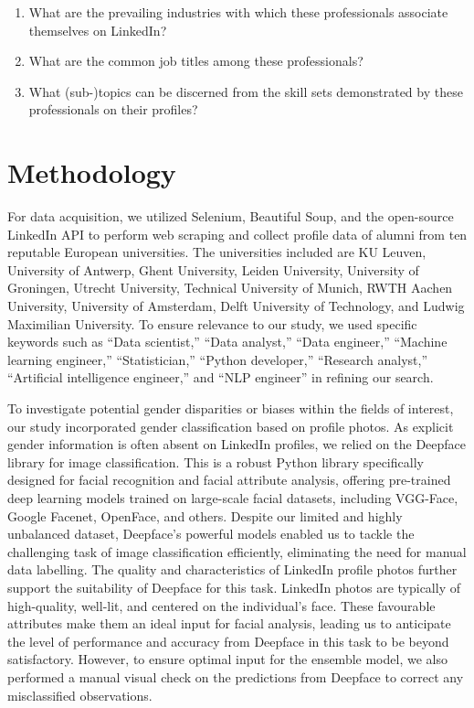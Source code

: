 \documentclass[11pt,]{article}
\begin{document}
\begin{enumerate}
\def\labelenumi{\arabic{enumi}.}
\item
  What are the prevailing industries with which these professionals
  associate themselves on LinkedIn?
\item
  What are the common job titles among these professionals?
\item
  What (sub-)topics can be discerned from the skill sets demonstrated by
  these professionals on their profiles?
\end{enumerate}

\hypertarget{methodology}{%
\section{Methodology}\label{methodology}}

For data acquisition, we utilized Selenium, Beautiful Soup, and the
open-source LinkedIn API to perform web scraping and collect profile
data of alumni from ten reputable European universities. The
universities included are KU Leuven, University of Antwerp, Ghent
University, Leiden University, University of Groningen, Utrecht
University, Technical University of Munich, RWTH Aachen University,
University of Amsterdam, Delft University of Technology, and Ludwig
Maximilian University. To ensure relevance to our study, we used
specific keywords such as ``Data scientist,'' ``Data analyst,'' ``Data
engineer,'' ``Machine learning engineer,'' ``Statistician,'' ``Python
developer,'' ``Research analyst,'' ``Artificial intelligence engineer,''
and ``NLP engineer'' in refining our search.

To investigate potential gender disparities or biases within the fields
of interest, our study incorporated gender classification based on
profile photos. As explicit gender information is often absent on
LinkedIn profiles, we relied on the Deepface library for image
classification. This is a robust Python library specifically designed
for facial recognition and facial attribute analysis, offering
pre-trained deep learning models trained on large-scale facial datasets,
including VGG-Face, Google Facenet, OpenFace, and others. Despite our
limited and highly unbalanced dataset, Deepface's powerful models
enabled us to tackle the challenging task of image classification
efficiently, eliminating the need for manual data labelling. The quality
and characteristics of LinkedIn profile photos further support the
suitability of Deepface for this task. LinkedIn photos are typically of
high-quality, well-lit, and centered on the individual's face. These
favourable attributes make them an ideal input for facial analysis,
leading us to anticipate the level of performance and accuracy from
Deepface in this task to be beyond satisfactory. However, to ensure
optimal input for the ensemble model, we also performed a manual visual
check on the predictions from Deepface to correct any misclassified
observations.
\end{document}
